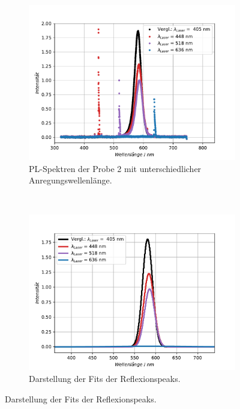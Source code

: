 \begin{figure}[hbtp]
\centering
\caption{Messungen und Ergebnisse zur Probe 2.}
	\begin{subfigure}[t]{0.45\textwidth}
	\includegraphics[width=\textwidth]{Plots/aufgabe2P2.pdf}
	\caption{PL-Spektren der Probe 2 mit unterschiedlicher Anregungswellenl\"{a}nge.}
	\label{}
	\end{subfigure}
	~
	\begin{subfigure}[t]{0.45\textwidth}
	\includegraphics[width=\textwidth]{Plots/aufgabe2P2_fit_1s.pdf}
	\caption{Darstellung der Fits der Reflexionspeaks.}
	\label{}
	\end{subfigure}
\label{}
\end{figure}


